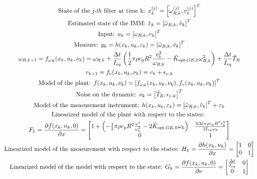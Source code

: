 \begin{gather}
  \text{State of the \textit{j-th} filter at time k: } x^{(j)}_{k} = \left[\omega_{R,k}^{(j)}, v_{k}^{(j)}\right]^T \\
  \text{Estimated state of the IMM: } \hat{x}_{k} = \left[\hat{\omega}_{R,k}, \hat{v}_{k}\right]^T \\
  \text{Input: } u_{k} = \left[\omega_{R,k}, v_{k}\right]^T \\
  \text{Measure: }  y_k = h(x_k, u_k, \varepsilon_k) = \left[\hat{\omega}_{R,k}, \hat{v}_{k}\right]^T \\
  \omega_{R,k+1} = f_{\omega_{R}}(x_k, u_k, \nu_k) = \omega_{R,k} + \frac{\Delta t}{I_{eq}} \left(\frac{1}{2}\pi\rho c_{p} R^2 \frac{v_k^3}{\omega_{R,k}} - \hat{K}_{opt,GE,k}\omega_{R,k}^2\right) + \frac{\Delta t}{I_{eq}}\tilde{T}_R\\
  v_{k+1} = f_{v}(x_k, u_k, \nu_k) = v_k + \epsilon_{v,k} \\
  \text{Model of the plant: } f(x_k, u_k, \nu_k) = \left[f_{\omega_{R}}(x_k, u_k, \nu_k), f_{v}(x_k, u_k, \nu_k)\right]^T\\
  \text{Noise on the dynamic: } \nu_k = \left[\tilde{T}_R, \epsilon_{v,k}\right]^T\\
  \text{Model of the measurement instrument: } h(x_k, u_k, \varepsilon_k) = \left[\hat{\omega}_{R,k}, \hat{v}_{k}\right]^T + \varepsilon_k\\
  \text{Linearized model of the plant with respect to the states: }\\\notag F_k = \frac{\partial f(x_k, u_k, 0)}{\partial x} = 
    \begin{bmatrix}
      1+\left(-\frac{1}{2}\pi\rho c_{p} R^2 \frac{v^3}{\omega_k^2}-2 \hat{K}_{opt,GE,k} \omega_k\right) & \frac{3\Delta t \pi \rho c_p R^2 v_k^2}{2 I_{eq} \omega_k}\\
      0 & 1 
    \end{bmatrix}\\
  \text{Linearized model of the measurement with respect to the states: }
  H_k = \frac{\partial h(x_k, u_k)}{\partial x}=
    \begin{bmatrix}
      1 & 0\\
      0 & 1 
    \end{bmatrix}\\
  \text{Linearized model of the model with respect to the state: } 
 G_k = \frac{\partial f(x_k, u_k, 0)}{\partial \nu} = 
  \begin{bmatrix}
    \frac{\Delta t}{I_{eq}} & 0\\
    0 & 1 
  \end{bmatrix}
\end{gather}
